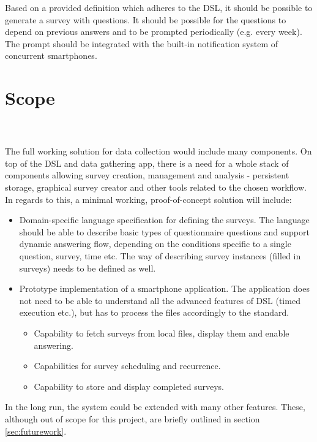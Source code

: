 Based on a provided definition which adheres to the DSL, it should be possible to generate a survey with questions. It should be possible for the questions to depend on previous answers and to be prompted periodically (e.g. every week). The prompt should be integrated with the built-in notification system of concurrent smartphones.

\section{Scope}
\label{sec:scope}
\pawel \\\\
The full working solution for data collection would include many components. On top of the DSL and data gathering app, there is a need for a whole stack of components allowing survey creation, management and analysis - persistent storage, graphical survey creator and other tools related to the chosen workflow. In regards to this, a minimal working, proof-of-concept solution will include:

\begin{itemize}
\item Domain-specific language specification for defining the surveys. The language should be able to describe basic types of questionnaire questions and support dynamic answering flow, depending on the conditions specific to a single question, survey, time etc. The way of describing survey instances (filled in surveys) needs to be defined as well.
\item Prototype implementation of a smartphone application. The application does not need to be able to understand all the advanced features of DSL (timed execution etc.), but has to process the files accordingly to the standard.
	\begin{itemize}
		\item Capability to fetch surveys from local files, display them and enable answering.
		\item Capabilities for survey scheduling and recurrence.
		\item Capability to store and display completed surveys.
	\end{itemize}
\end{itemize}

In the long run, the system could be extended with many other features. These, although out of scope for this project, are briefly outlined in section \ref{sec:futurework}.

